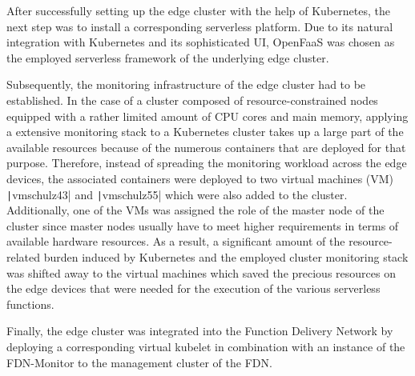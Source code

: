 After successfully setting up the edge cluster with the help of Kubernetes, the next step was to install a corresponding serverless platform. Due to its natural integration with Kubernetes and its sophisticated UI, OpenFaaS was chosen as the employed serverless framework of the underlying edge cluster.

Subsequently, the monitoring infrastructure of the edge cluster had to be established. In the case of a cluster composed of resource-constrained nodes equipped with a rather limited amount of CPU cores and main memory, applying a extensive monitoring stack to a Kubernetes cluster takes up a large part of the available resources because of the numerous containers that are deployed for that purpose. Therefore, instead of spreading the monitoring workload across the edge devices, the associated containers were deployed to two virtual machines (VM) \texttt|vmschulz43| and \texttt|vmschulz55| which were also added to the cluster. Additionally, one of the VMs was assigned the role of the master node of the cluster since master nodes usually have to meet higher requirements in terms of available hardware resources. As a result, a significant amount of the resource-related burden induced by Kubernetes and the employed cluster monitoring stack was shifted away to the virtual machines which saved the precious resources on the edge devices that were needed for the execution of the various serverless functions.

Finally, the edge cluster was integrated into the Function Delivery Network by deploying a corresponding virtual kubelet in combination with an instance of the FDN-Monitor to the management cluster of the FDN.
